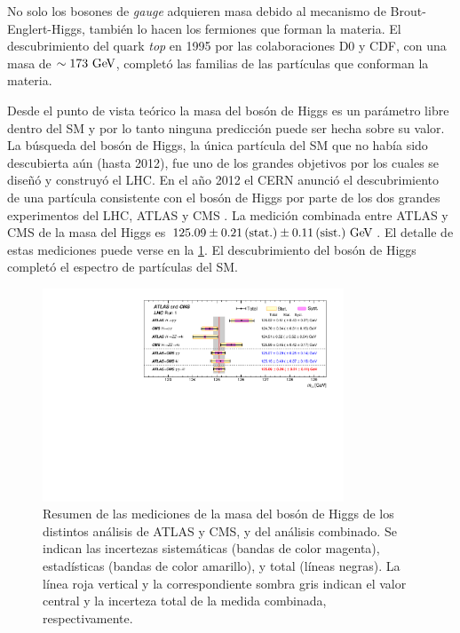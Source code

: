 No solo los bosones de \emph{gauge} adquieren masa debido al mecanismo de Brout-Englert-Higgs,
también lo hacen los fermiones que forman la materia. El descubrimiento del
quark \emph{top} en 1995 por las colaboraciones D0 y CDF, con una masa de $\sim 173
\GeV$, completó las familias de las partículas que conforman la materia.

Desde el punto de vista teórico la masa del bosón de Higgs es un parámetro libre
dentro del SM y por lo tanto ninguna predicción puede ser hecha sobre su valor. La búsqueda
del bosón de Higgs, la única partícula del SM que no había sido descubierta
aún (hasta 2012), fue uno de los grandes objetivos por los cuales se dise\~nó y construyó el
LHC. En el a\~no 2012 el CERN anunció el
descubrimiento de una partícula consistente con el bosón de Higgs por parte de
los dos grandes experimentos del LHC, ATLAS y CMS
\cite{Aad:2012tfa,Chatrchyan:2012ufa}. La medición combinada entre ATLAS y CMS
de la masa del Higgs es $125.09 \pm 0.21\, \text{(stat.)} \pm 0.11\, \text{(sist.)}
\gev$\cite{HiggsMass_ATLAS_CMS}.
El detalle de estas mediciones  puede verse en la \cref{fig:higgs_cms_atlas}.
El descubrimiento del bosón de Higgs completó el espectro de partículas del SM.

\begin{figure}[!htbp]
  \centering
  \includegraphics[width=0.8\textwidth]{figures/higgs_atlas_cms_mass}
  \caption{Resumen de las mediciones de la masa del bosón de Higgs de los
    distintos análisis de ATLAS y CMS, y del análisis combinado. Se indican las
    incertezas sistemáticas (bandas de color magenta), estadísticas (bandas de
    color amarillo), y total (líneas negras). La línea roja vertical y la
    correspondiente sombra gris indican el valor central y la incerteza total de
    la medida combinada, respectivamente\cite{HiggsMass_ATLAS_CMS}.}
  \label{fig:higgs_cms_atlas}
\end{figure}



